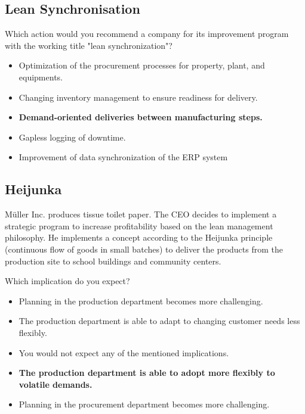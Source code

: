 \subsection{Lean Synchronisation}
Which action would you recommend a company for its improvement program with the working title "lean synchronization"?

\begin{itemize}
\item Optimization of the procurement processes for property, plant, and equipments. 
\item Changing inventory management to ensure readiness for delivery. 
\item \textbf{Demand-oriented deliveries between manufacturing steps.} 
\item Gapless logging of downtime. 
\item Improvement of data synchronization of the ERP system
\end{itemize}
\subsection{Heijunka}
M\"uller Inc. produces tissue toilet paper. The CEO decides to implement a strategic program to increase profitability based on the lean management philosophy. He implements a concept according to the Heijunka principle (continuous flow of goods in small batches) to deliver the products from the production site to school buildings and community centers. 

Which implication do you expect?
\begin{itemize}
\item Planning in the production department becomes more challenging. 
\item The production department is able to adapt to changing customer needs less flexibly. 
\item You would not expect any of the mentioned implications. 
\item \textbf{The production department is able to adopt more flexibly to volatile demands.}
\item Planning in the procurement department becomes more challenging. 
\end{itemize}
